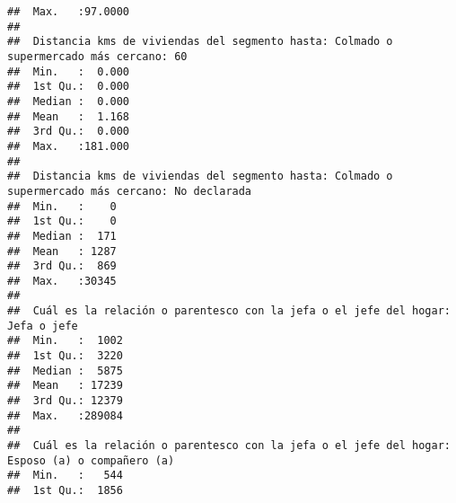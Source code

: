 \documentclass[11pt,]{article}
\begin{document}
\begin{verbatim}
##  Max.   :97.0000                                                                      
##                                                                                       
##  Distancia kms de viviendas del segmento hasta: Colmado o supermercado más cercano: 60
##  Min.   :  0.000                                                                      
##  1st Qu.:  0.000                                                                      
##  Median :  0.000                                                                      
##  Mean   :  1.168                                                                      
##  3rd Qu.:  0.000                                                                      
##  Max.   :181.000                                                                      
##                                                                                       
##  Distancia kms de viviendas del segmento hasta: Colmado o supermercado más cercano: No declarada
##  Min.   :    0                                                                                  
##  1st Qu.:    0                                                                                  
##  Median :  171                                                                                  
##  Mean   : 1287                                                                                  
##  3rd Qu.:  869                                                                                  
##  Max.   :30345                                                                                  
##                                                                                                 
##  Cuál es la relación o parentesco con la jefa o el jefe del hogar: Jefa o jefe
##  Min.   :  1002                                                               
##  1st Qu.:  3220                                                               
##  Median :  5875                                                               
##  Mean   : 17239                                                               
##  3rd Qu.: 12379                                                               
##  Max.   :289084                                                               
##                                                                               
##  Cuál es la relación o parentesco con la jefa o el jefe del hogar: Esposo (a) o compañero (a)
##  Min.   :   544                                                                              
##  1st Qu.:  1856                                                                              

\end{verbatim}
\end{document}
